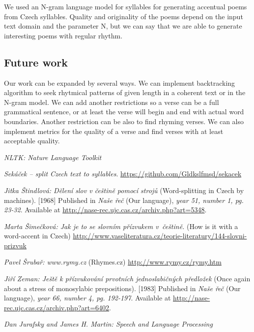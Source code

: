 \documentclass[a4]{article}
\begin{document}
We used an N-gram language model for syllables for generating accentual
poems from Czech syllables. Quality and originality of the poems depend on the input text
domain and the parameter N, but we can say that we are able to generate
interesting poems with regular rhythm.

\subsection{Future work}

Our work can be expanded by several ways. We can implement backtracking
algorithm to seek rhytmical patterns of given length in a coherent text or in the N-gram
model. We can add another restrictions so a verse can be a full grammatical
sentence, or at least the verse will begin and end with actual word
boundaries. Another restriction can be also to find rhyming verses.
We can also implement metrics for the quality of a verse and
find verses with at least acceptable quality. 

\pagebreak


\begin{thebibliography}{99}

 {\sl NLTK: Nature Language Toolkit}

 {\sl Sekáček -- split Czech text to syllables}.
 \url{https://github.com/Gldkslfmsd/sekacek}


 {\sl Jitka Štindlová: Dělení slov v češtině pomocí strojů}
(Word-splitting in Czech by machines). [1968] Published in {\sl Naše řeč}
(Our language),
{\sl year 51, number 1, pg. 23-32}. Available at
\url{http://nase-rec.ujc.cas.cz/archiv.php?art=5348}.


 {\sl Marta Šimečková: Jak je to se slovním přízvukem v~češtině.} (How is
 it with a word-accent in Czech)
 \url{http://www.vaseliteratura.cz/teorie-literatury/144-slovni-prizvuk}


 {\sl Pavel Šrubař: www.rymy.cz} (Rhymes.cz)
 \url{http://www.rymy.cz/rymy.htm}




 {\sl Jiří Zeman: Ještě k přízvukování prvotních jednoslabičných
 předložek}
(Once again about a stress of monosylabic prepositions). [1983] Published in {\sl Naše řeč}
(Our language),
{\sl year 66, number 4, pg. 192-197}. Available at
\url{http://nase-rec.ujc.cas.cz/archiv.php?art=6402}.



 {\sl  Dan Jurafsky and James H. Martin:	
 Speech and Language Processing
 }




\end{thebibliography}



\end{document}
